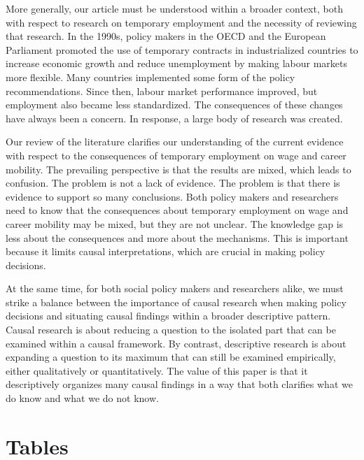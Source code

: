 \documentclass[12pt]{article}
\begin{document}
More generally, our article must be understood within a broader context, both with respect to research on temporary employment and the necessity of reviewing that research.  In the 1990s, policy makers in the OECD and the European Parliament promoted the use of temporary contracts in industrialized countries to increase economic growth and reduce unemployment by making labour markets more flexible.  Many countries implemented some form of the policy recommendations.  Since then, labour market performance improved, but employment also became less standardized.  The consequences of these changes have always been a concern.  In response, a large body of research was created.  

Our review of the literature clarifies our understanding of the current evidence with respect to the consequences of temporary employment on wage and career mobility.  The prevailing perspective is that the results are mixed, which leads to confusion.  The problem is not a lack of evidence.  The problem is that there is evidence to support so many conclusions.  Both policy makers and researchers need to know that the consequences about temporary employment on wage and career mobility may be mixed, but they are not unclear.  The knowledge gap is less about the consequences and more about the mechanisms.  This is important because it limits causal interpretations, which are crucial in making policy decisions.  

At the same time, for both social policy makers and researchers alike, we must strike a balance between the importance of causal research when making policy decisions and situating causal findings within a broader descriptive pattern.  Causal research is about reducing a question to the isolated part that can be examined within a causal framework.  By contrast, descriptive research is about expanding a question to its maximum that can still be examined empirically, either qualitatively or quantitatively.  The value of this paper is that it descriptively organizes many causal findings in a way that both clarifies what we do know and what we do not know.


\clearpage
\singlespacing



\clearpage
\section{Tables}
\end{document}
